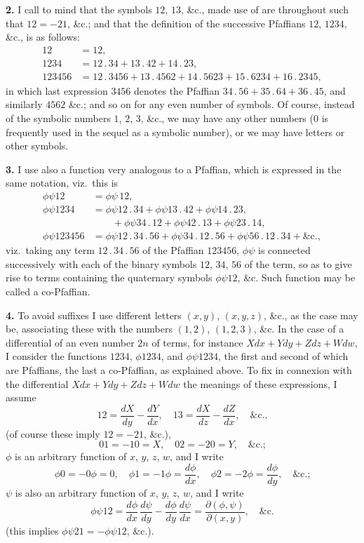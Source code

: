 \documentclass[11pt]{article}
\begin{document}
\medskip
\textbf{2.} I call to mind that the symbols $12$, $13$, \&c., made use of are throughout such that $12=-21$, \&c.; and that the definition of the successive Pfaffians $12$, $1234$, \&c., is as follows:
\begin{align*}
12 &= 12,\\
1234 &= 12\,.\,34 + 13\,.\,42 + 14\,.\,23,\\
123456 &= 12\,.\,3456 + 13\,.\,4562 + 14\,.\,5623 + 15\,.\,6234 + 16\,.\,2345,
\end{align*}
in which last expression $3456$ denotes the Pfaffian $34\,.\,56 + 35\,.\,64 + 36\,.\,45$, and similarly $4562$ \&c.; and so on for any even number of symbols. Of course, instead of the symbolic numbers $1$, $2$, $3$, \&c., we may have any other numbers ($0$ is frequently used in the sequel as a symbolic number), or we may have letters or other symbols.

\medskip
\textbf{3.} I use also a function very analogous to a Pfaffian, which is expressed in the same notation, viz.\ this is
\begin{align*}
\phi\psi 12 &= \phi\psi\,12,\\
\phi\psi 1234 &= \phi\psi 12\,.\,34 + \phi\psi 13\,.\,42 + \phi\psi 14\,.\,23,\\
&\quad\quad + \phi\psi 34\,.\,12 + \phi\psi 42\,.\,13 + \phi\psi 23\,.\,14,\\
\phi\psi 123456 &= \phi\psi 12\,.\,34\,.\,56 + \phi\psi 34\,.\,12\,.\,56 + \phi\psi 56\,.\,12\,.\,34 + \&\text{c.},
\end{align*}
viz.\ taking any term $12\,.\,34\,.\,56$ of the Pfaffian $123456$, $\phi\psi$ is connected successively with each of the binary symbols $12$, $34$, $56$ of the term, so as to give rise to terms containing the quaternary symbols $\phi\psi 12$, \&c. Such function may be called a co-Pfaffian.

\medskip
\textbf{4.} To avoid suffixes I use different letters $(x,y)$, $(x,y,z)$, \&c., as the case may be, associating these with the numbers $(1,2)$, $(1,2,3)$, \&c. In the case of a differential of an even number $2n$ of terms, for instance $Xdx + Ydy + Zdz + Wdw$, I consider the functions $1234$, $\phi 1234$, and $\phi\psi 1234$, the first and second of which are Pfaffians, the last a co-Pfaffian, as explained above. To fix in connexion with the differential $Xdx + Ydy + Zdz + Wdw$ the meanings of these expressions, I assume
\[
12 = \frac{dX}{dy} - \frac{dY}{dx},\quad 13 = \frac{dX}{dz} - \frac{dZ}{dx},\quad \&\text{c.,}
\]
(of course these imply $12=-21$, \&c.),
\[
01 = -10 = X,\quad 02 = -20 = Y,\quad \&\text{c.;}
\]
$\phi$ is an arbitrary function of $x$, $y$, $z$, $w$, and I write
\[
\phi 0 = -0\phi = 0,\quad \phi 1 = -1\phi = \frac{d\phi}{dx},\quad \phi 2 = -2\phi = \frac{d\phi}{dy},\quad \&\text{c.;}
\]
$\psi$ is also an arbitrary function of $x$, $y$, $z$, $w$, and I write
\[
\phi\psi 12 = \frac{d\phi}{dx}\,\frac{d\psi}{dy} - \frac{d\phi}{dy}\,\frac{d\psi}{dx} = \frac{\partial(\phi,\psi)}{\partial(x,y)},\quad \&\text{c.}
\]
(this implies $\phi\psi 21 = -\phi\psi 12$, \&c.).
\end{document}
